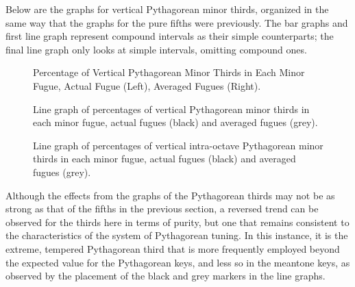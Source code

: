 Below are the graphs for vertical Pythagorean minor thirds, organized in
the same way that the graphs for the pure fifths were previously. The
bar graphs and first line graph represent compound intervals as their
simple counterparts; the final line graph only looks at simple
intervals, omitting compound ones.



\begin{figure}[H]
\vspace{1.5em}
    \centering
    \caption[Percentage of Vertical Pythagorean Minor Thirds in Each Minor Fugue. ]{Percentage of Vertical Pythagorean Minor Thirds in Each Minor Fugue, Actual Fugue (Left), Averaged Fugues (Right).}
\end{figure}


\begin{figure}[H]
\vspace{1.5em}
    \centering
    \caption[Line graph of percentages of vertical Pythagorean minor thirds in each minor fugue, actual fugues vs. averaged fugues. ]{Line graph of percentages of vertical Pythagorean minor thirds in each minor fugue, actual fugues (black) and averaged fugues (grey).}
\end{figure}


\begin{figure}[H]
\vspace{1.5em}
    \centering
    \caption[Line graph of percentages of vertical intra-octave Pythagorean minor thirds in each minor fugue, actual fugues vs. averaged fugues. ]{Line graph of percentages of vertical intra-octave Pythagorean minor thirds in each minor fugue, actual fugues (black) and averaged fugues (grey).}
\end{figure}    Although the effects from the graphs of the Pythagorean thirds may not
be as strong as that of the fifths in the previous section, a reversed
trend can be observed for the thirds here in terms of purity, but one
that remains consistent to the characteristics of the system of
Pythagorean tuning. In this instance, it is the extreme, tempered
Pythagorean third that is more frequently employed beyond the expected
value for the Pythagorean keys, and less so in the meantone keys, as
observed by the placement of the black and grey markers in the line
graphs.


